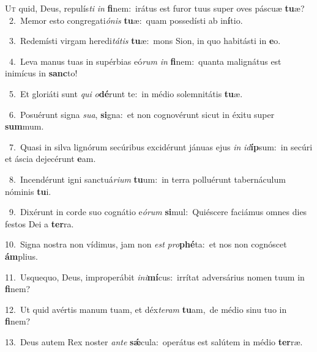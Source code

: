 \lettrine{\initial\textcolor{\initialcolor}{U}}{t} quid, Deus, repulís\textit{ti} \textit{in} \textbf{fi}\-nem:~\star irátus est furor tuus super oves páscuæ \textbf{tu}\-æ?\\
{\numbfont\textcolor{\numbcolor}{~2.}}~Memor esto congregati\-\textit{ó}\-\textit{nis} \textbf{tu}\-æ:~\star quam possedísti ab in\-\textbf{í}\-tio.\par
{\numbfont\textcolor{\numbcolor}{~3.}}~Redemísti virgam heredi\-\textit{tá}\-\textit{tis} \textbf{tu}\-æ:~\star mons Sion, in quo habitásti in \textbf{e}\-o.\par
{\numbfont\textcolor{\numbcolor}{~4.}}~Leva manus tuas in supérbias eó\textit{rum} \textit{in} \textbf{fi}\-nem:~\star quanta malignátus est inimícus in \textbf{sanc}\-to!\par
{\numbfont\textcolor{\numbcolor}{~5.}}~Et gloriáti sunt \textit{qui} \textit{o}\-\textbf{dé}runt te:~\star in médio solemnitátis \textbf{tu}\-æ.\par
{\numbfont\textcolor{\numbcolor}{~6.}}~Posuérunt signa \textit{su}\-\textit{a}, \textbf{si}\-gna:~\star et non cognovérunt sicut in éxitu super \textbf{sum}\-mum.\par
{\numbfont\textcolor{\numbcolor}{~7.}}~Quasi in silva lignórum secúribus excidérunt jánuas ejus \textit{in} \textit{id}\-\textbf{íp}sum:~\star in secúri et áscia dejecérunt \textbf{e}\-am.\par
{\numbfont\textcolor{\numbcolor}{~8.}}~Incendérunt igni sanctuá\-\textit{ri}\-\textit{um} \textbf{tu}\-um:~\star in terra polluérunt tabernáculum nóminis \textbf{tu}\-i.\par
{\numbfont\textcolor{\numbcolor}{~9.}}~Dixérunt in corde suo cognátio e\-\textit{ó}\-\textit{rum} \textbf{si}\-mul:~\star Quiéscere faciámus omnes dies festos Dei a \textbf{ter}\-ra.\par
{\numbfont\textcolor{\numbcolor}{10.}}~Signa nostra non vídimus, jam non \textit{est} \textit{pro}\-\textbf{phé}ta:~\star et nos non cognóscet \textbf{ám}\-plius.\par
{\numbfont\textcolor{\numbcolor}{11.}}~Usquequo, Deus, improperábit \textit{in}\-\textit{i}\textbf{mí}cus:~\star irrítat adversárius nomen tuum in \textbf{fi}\-nem?\par
{\numbfont\textcolor{\numbcolor}{12.}}~Ut quid avértis manum tuam, et déx\-\textit{te}\-\textit{ram} \textbf{tu}\-am,~\star de médio sinu tuo in \textbf{fi}\-nem?\par
{\numbfont\textcolor{\numbcolor}{13.}}~Deus autem Rex noster \textit{an}\-\textit{te} \textbf{sǽ}\-cula:~\star operátus est salútem in médio \textbf{ter}\-ræ.\par
